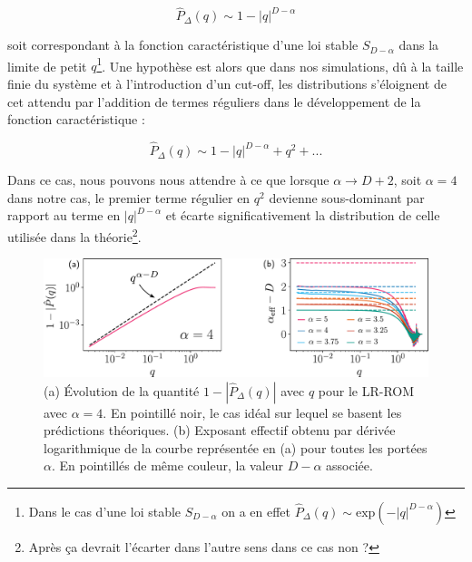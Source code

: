 \begin{equation}
	\hat{P}_\Delta(q) \sim 1-|q|^{D-\alpha}
\end{equation}

\noindent soit correspondant à la fonction caractéristique d'une loi stable $S_{D-\alpha}$ dans la limite de petit $q$\footnote{Dans le cas d'une loi stable $S_{D-\alpha}$ on a en effet $\hat{P}_\Delta(q) \sim \text{exp}\left( -|q|^{D-\alpha} \right)$}. Une hypothèse est alors que dans nos simulations, dû à la taille finie du système et à l'introduction d'un cut-off, les distributions s'éloignent de cet attendu par l'addition de termes réguliers dans le développement de la fonction caractéristique :

\begin{equation}
	\hat{P}_\Delta(q) \sim 1-|q|^{D-\alpha} + q^2 + ...
	\label{eq:DevStable}
\end{equation}

\noindent Dans ce cas, nous pouvons nous attendre à ce que lorsque $\alpha \rightarrow D+2$, soit $\alpha=4$ dans notre cas, le premier terme régulier en $q^2$ devienne sous-dominant par rapport au terme en $|q|^{D-\alpha}$ et écarte significativement la distribution de celle utilisée dans la théorie\footnote{Après ça devrait l'écarter dans l'autre sens dans ce cas non ?}.

\begin{figure}[h]
	\centering
	\includegraphics[width=\textwidth]{Chapitre2/Figures/Hyperuniformity/GammaEff_ROM.pdf}
	\caption{(a) Évolution de la quantité $1-|\hat{P}_\Delta (q)|$ avec $q$ pour le LR-ROM avec $\alpha=4$. En pointillé noir, le cas idéal sur lequel se basent les prédictions théoriques. (b) Exposant effectif obtenu par dérivée logarithmique de la courbe représentée en (a) pour toutes les portées $\alpha$. En pointillés de même couleur, la valeur $D-\alpha$ associée.}
	\label{fig:GammaEffROM}
\end{figure}

